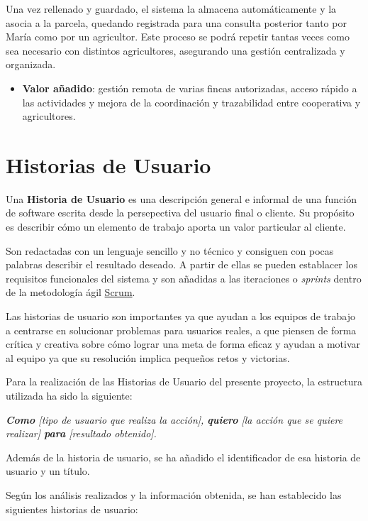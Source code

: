 \begin{itemize}
    Una vez rellenado y guardado, el sistema la almacena automáticamente y la asocia a la parcela, quedando registrada para una
    consulta posterior tanto por María como por un agricultor. Este proceso se podrá repetir tantas veces como sea necesario con 
    distintos agricultores, asegurando una gestión centralizada y organizada.

    \begin{itemize}
        \item \textbf{Valor añadido}: gestión remota de varias fincas autorizadas, acceso rápido a las actividades y
        mejora de la coordinación y trazabilidad entre cooperativa y agricultores. 
    \end{itemize}
\end{itemize}

\section{Historias de Usuario}

Una \textbf{Historia de Usuario} \cite{historiaUsuario} es una descripción general e informal de una función de software escrita 
desde la persepectiva del usuario final o cliente. Su propósito es describir cómo un elemento de trabajo aporta un valor 
particular al cliente.

Son redactadas con un lenguaje sencillo y no técnico y consiguen con pocas palabras describir el resultado deseado. A partir de 
ellas se pueden establacer los requisitos funcionales del sistema y son añadidas a las iteraciones o \textit{sprints} dentro de 
la metodología ágil \hyperlink{scrum}{Scrum}.

Las historias de usuario son importantes ya que ayudan a los equipos de trabajo a centrarse en solucionar problemas para
usuarios reales, a que piensen de forma crítica y creativa sobre cómo lograr una meta de forma eficaz y ayudan a 
motivar al equipo ya que su resolución implica pequeños retos y victorias.

Para la realización de las Historias de Usuario del presente proyecto, la estructura utilizada ha sido la siguiente:

\textit{\textbf{Como} [tipo de usuario que realiza la acción], \textbf{quiero} [la acción que se quiere realizar] \textbf{para} 
[resultado obtenido].}

Además de la historia de usuario, se ha añadido el identificador de esa historia de usuario y un título.

Según los análisis realizados y la información obtenida, se han establecido las siguientes historias de usuario:

